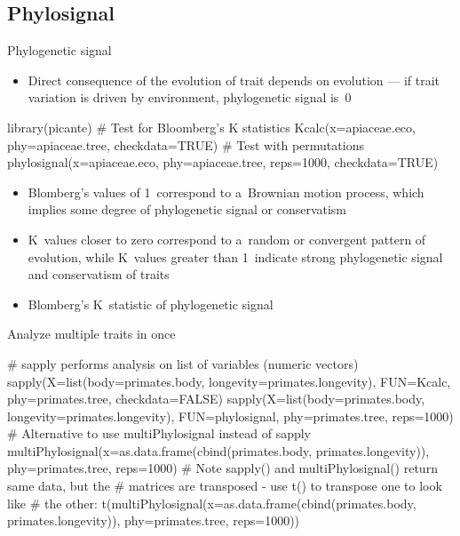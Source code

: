 \documentclass[compress, ucs, xelatex, 11pt, xcolor=svgnames,
  hyperref={
    bookmarks=true,
    unicode=true,
    colorlinks=true,
    pdftitle={Molecular data in R},
    plainpages=false,
    pdfauthor={Vojtech Zeisek},
    pdfsubject={Course about phylogeny and evolution in R},
    pdfcreator={XeLaTeX},
    pdfkeywords={R, evolution, phylogeny, molecular data},
    linkcolor=Tomato,
    anchorcolor=SaddleBrown,
    citecolor=Goldenrod,
    filecolor=DarkMagenta,
    menucolor=Sienna,
    urlcolor=DarkTurquoise,
    pdftex},
  url={hyphens, lowtilde} %
  ]{beamer}
\begin{document}
\subsection{Phylosignal}

\begin{frame}[fragile]{Phylogenetic signal}
  \begin{itemize}
    \item Direct consequence of the evolution of trait depends on evolution --- if trait variation is driven by environment, phylogenetic signal is~0
  \end{itemize}
  \begin{spluscode}
    library(picante)
    # Test for Bloomberg's K statistics
    Kcalc(x=apiaceae.eco, phy=apiaceae.tree, checkdata=TRUE)
    # Test with permutations
    phylosignal(x=apiaceae.eco, phy=apiaceae.tree, reps=1000,
      checkdata=TRUE)
  \end{spluscode}
  \begin{itemize}
    \item Blomberg's values of 1~correspond to a~Brownian motion process, which implies some degree of phylogenetic signal or conservatism
    \item K~values closer to zero correspond to a~random or convergent pattern of evolution, while K~values greater than 1~indicate strong phylogenetic signal and conservatism of traits
    \item Blomberg's K~statistic of phylogenetic signal
  \end{itemize}
\end{frame}

\begin{frame}[fragile]{Analyze multiple traits in once}
  \begin{spluscode}
    # sapply performs analysis on list of variables (numeric vectors)
    sapply(X=list(body=primates.body, longevity=primates.longevity),
      FUN=Kcalc, phy=primates.tree, checkdata=FALSE)
    sapply(X=list(body=primates.body, longevity=primates.longevity),
      FUN=phylosignal, phy=primates.tree, reps=1000)
    # Alternative to use multiPhylosignal instead of sapply
    multiPhylosignal(x=as.data.frame(cbind(primates.body,
      primates.longevity)), phy=primates.tree, reps=1000)
    # Note sapply() and multiPhylosignal() return same data, but the
    # matrices are transposed - use t() to transpose one to look like
    # the other:
    t(multiPhylosignal(x=as.data.frame(cbind(primates.body,
      primates.longevity)), phy=primates.tree, reps=1000))
  \end{spluscode}
\end{frame}
\end{document}
